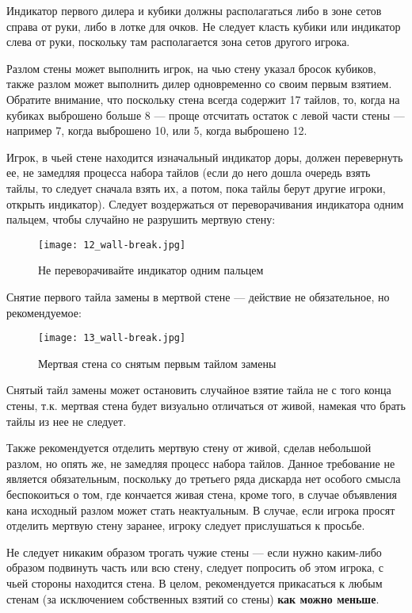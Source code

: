 Индикатор первого дилера и кубики должны располагаться либо в зоне сетов справа от руки, либо в лотке для очков. Не следует класть кубики или индикатор слева от руки, поскольку там располагается зона сетов другого игрока.

Разлом стены может выполнить игрок, на чью стену указал бросок кубиков, также разлом может выполнить дилер одновременно со своим первым взятием. Обратите внимание, что поскольку стена всегда содержит 17 тайлов, то, когда на кубиках выброшено больше 8 --- проще отсчитать остаток с левой части стены --- например 7, когда выброшено 10, или 5, когда выброшено 12.

\newpage

Игрок, в чьей стене находится изначальный индикатор доры, должен перевернуть ее, не замедляя процесса набора тайлов (если до него дошла очередь взять тайлы, то следует сначала взять их, а потом, пока тайлы берут другие игроки, открыть индикатор). Следует воздержаться от переворачивания индикатора одним пальцем, чтобы случайно не разрушить мертвую стену:

\begin{figure}[H]
	\centering
	\texttt{[image: 12\_wall-break.jpg]}
	\caption{Не переворачивайте индикатор одним пальцем}
\end{figure}

Снятие первого тайла замены в мертвой стене --- действие не обязательное, но рекомендуемое:

\begin{figure}[H]
	\centering
	\texttt{[image: 13\_wall-break.jpg]}
	\caption{Мертвая стена со снятым первым тайлом замены}
\end{figure}

Снятый тайл замены может остановить случайное взятие тайла не с того конца стены, т.к. мертвая стена будет визуально отличаться от живой, намекая что брать тайлы из нее не следует. 

Также рекомендуется отделить мертвую стену от живой, сделав небольшой разлом, но опять же, не замедляя процесс набора тайлов. Данное требование не является обязательным, поскольку до третьего ряда дискарда нет особого смысла беспокоиться о том, где кончается живая стена, кроме того, в случае объявления кана исходный разлом может стать неактуальным. В случае, если игрока просят отделить мертвую стену заранее, игроку следует прислушаться к просьбе.

Не следует никаким образом трогать чужие стены --- если нужно каким-либо образом подвинуть часть или всю стену, следует попросить об этом игрока, с чьей стороны находится стена. В целом, рекомендуется прикасаться к любым стенам (за исключением собственных взятий со стены) \textbf{как можно меньше}.

